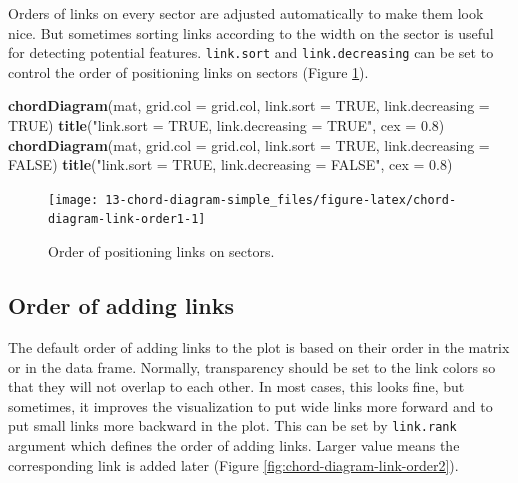 \documentclass[]{book}
\newenvironment{Shaded}{\begin{snugshade}}{\end{snugshade}}
\newcommand{\KeywordTok}[1]{\textcolor[rgb]{0.13,0.29,0.53}{\textbf{#1}}}
\newcommand{\DataTypeTok}[1]{\textcolor[rgb]{0.13,0.29,0.53}{#1}}
\newcommand{\FloatTok}[1]{\textcolor[rgb]{0.00,0.00,0.81}{#1}}
\newcommand{\StringTok}[1]{\textcolor[rgb]{0.31,0.60,0.02}{#1}}
\newcommand{\OtherTok}[1]{\textcolor[rgb]{0.56,0.35,0.01}{#1}}
\newcommand{\NormalTok}[1]{#1}
\begin{document}
Orders of links on every sector are adjusted automatically to make them
look nice. But sometimes sorting links according to the width on the
sector is useful for detecting potential features. \texttt{link.sort}
and \texttt{link.decreasing} can be set to control the order of
positioning links on sectors (Figure
\ref{fig:chord-diagram-link-order1}).

\begin{Shaded}
\begin{Highlighting}[]
\KeywordTok{chordDiagram}\NormalTok{(mat, }\DataTypeTok{grid.col =}\NormalTok{ grid.col, }\DataTypeTok{link.sort =} \OtherTok{TRUE}\NormalTok{, }\DataTypeTok{link.decreasing =} \OtherTok{TRUE}\NormalTok{)}
\KeywordTok{title}\NormalTok{(}\StringTok{"link.sort = TRUE, link.decreasing = TRUE"}\NormalTok{, }\DataTypeTok{cex =} \FloatTok{0.8}\NormalTok{)}
\KeywordTok{chordDiagram}\NormalTok{(mat, }\DataTypeTok{grid.col =}\NormalTok{ grid.col, }\DataTypeTok{link.sort =} \OtherTok{TRUE}\NormalTok{, }\DataTypeTok{link.decreasing =} \OtherTok{FALSE}\NormalTok{)}
\KeywordTok{title}\NormalTok{(}\StringTok{"link.sort = TRUE, link.decreasing = FALSE"}\NormalTok{, }\DataTypeTok{cex =} \FloatTok{0.8}\NormalTok{)}
\end{Highlighting}
\end{Shaded}

\begin{figure}

{\centering \texttt{[image: 13-chord-diagram-simple\_files/figure-latex/chord-diagram-link-order1-1]} 

}

\caption{Order of positioning links on sectors.}\label{fig:chord-diagram-link-order1}
\end{figure}

\subsection{Order of adding links}\label{order-of-adding-links}

The default order of adding links to the plot is based on their order in
the matrix or in the data frame. Normally, transparency should be set to
the link colors so that they will not overlap to each other. In most
cases, this looks fine, but sometimes, it improves the visualization to
put wide links more forward and to put small links more backward in the
plot. This can be set by \texttt{link.rank} argument which defines the
order of adding links. Larger value means the corresponding link is
added later (Figure \ref{fig:chord-diagram-link-order2}).
\end{document}
